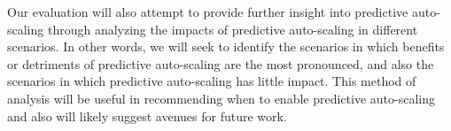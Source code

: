 Our evaluation will also attempt to provide
further insight into predictive auto-scaling
through analyzing the impacts of predictive auto-scaling in different scenarios.
In other words, we will seek to identify the scenarios in which benefits or
detriments of predictive auto-scaling are the most pronounced, and also the
scenarios in which predictive auto-scaling has little impact. This method of
analysis will be useful in recommending when to enable predictive auto-scaling
and also will likely suggest avenues for future work.
